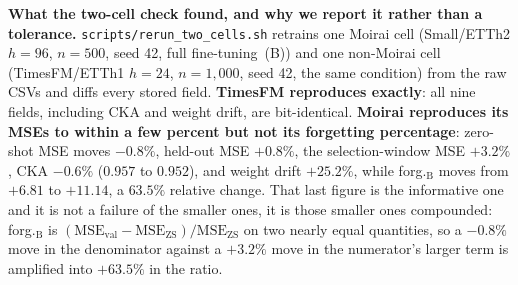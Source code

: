 \textbf{What the two-cell check found, and why we report it rather than a
tolerance.}  \texttt{scripts/rerun\_two\_cells.sh} retrains one Moirai cell
(Small/ETTh2 $h{=}96$, $n{=}500$, seed 42, full fine-tuning~(B)) and one non-Moirai
cell (TimesFM/ETTh1 $h{=}24$, $n{=}1{,}000$, seed 42, the same condition) from the raw
CSVs
and diffs every stored field.  \textbf{TimesFM reproduces exactly}: all nine
fields, including CKA and weight drift, are bit-identical.  \textbf{Moirai
reproduces its MSEs to within a few percent but not its forgetting percentage}:
zero-shot MSE moves $-0.8\%$, held-out MSE $+0.8\%$, the selection-window MSE
$+3.2\%$, CKA $-0.6\%$ ($0.957$ to $0.952$), and weight drift $+25.2\%$, while
forg.$_\text{B}$ moves from $+6.81$ to $+11.14$, a $63.5\%$ relative change.
That last figure is the informative one and it is not a failure of the smaller
ones, it is those smaller ones compounded: forg.$_\text{B}$ is
$(\text{MSE}_\text{val}-\text{MSE}_\text{ZS})/\text{MSE}_\text{ZS}$ on two nearly
equal quantities, so a $-0.8\%$ move in the denominator against a $+3.2\%$ move in
the numerator's larger term is amplified into $+63.5\%$ in the ratio.
